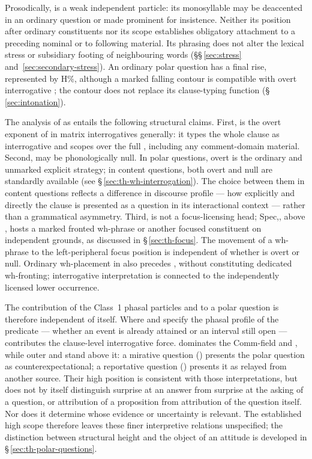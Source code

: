 Prosodically,  is a weak independent particle: its monosyllable may
be deaccented in an ordinary question or made prominent for insistence.
Neither its position after ordinary constituents nor its scope establishes
obligatory attachment to a preceding nominal or to following material. Its
phrasing does not alter
the lexical stress or subsidiary footing of neighbouring words
(§§\,\ref{sec:stress} and~\ref{sec:secondary-stress}). An ordinary polar
question has a final rise, represented by H\%, although a marked falling
contour is compatible with overt interrogative ; the contour does
not replace its clause-typing function (§\,\ref{sec:intonation}).

The analysis of  as  entails the following
structural claims. First,  is the overt exponent of 
in matrix interrogatives generally: it types the whole clause as interrogative
and scopes over the full , including any comment-domain material. Second,
 may be phonologically null. In polar questions, overt
 is the ordinary and unmarked explicit strategy; in content questions,
both overt  and null  are standardly available
(see §\,\ref{sec:th-wh-interrogation}). The choice between them in content
questions reflects a difference in discourse profile --- how explicitly and
directly the clause is presented as a question in its interactional context ---
rather than a grammatical asymmetry. Third,  is not a
focus-licensing head; Spec,, above , hosts
a marked fronted wh-phrase or another focused constituent on independent
grounds, as discussed in
§\,\ref{sec:th-focus}. The movement of a wh-phrase to the left-peripheral
focus position is independent of whether  is overt or
null. Ordinary wh-placement in  also precedes ,
without constituting dedicated wh-fronting; interrogative interpretation is
connected to the independently licensed lower occurrence.

The contribution of the Class~1 phasal particles  and  to a
polar question is therefore independent of  itself. Where 
and  specify the phasal profile of the predicate — whether an event
is already attained or an interval still open —  contributes the
clause-level interrogative force.  dominates the Comm-field
and , while outer  and
 stand above it: a mirative question
() presents the polar question as counterexpectational; a
reportative question () presents it as relayed from another
source. Their high position is consistent with those interpretations, but
does not by itself distinguish surprise at an answer from surprise at the
asking of a question, or attribution of a proposition from attribution of
the question itself. Nor does it determine whose evidence or uncertainty
is relevant. The established high scope therefore leaves these finer
interpretive relations unspecified; the distinction between structural
height and the object of an attitude is developed in
§\,\ref{sec:th-polar-questions}.

